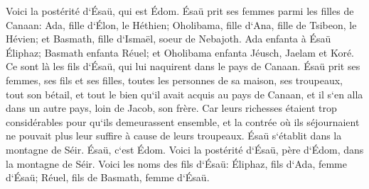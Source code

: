 \verse Voici la postérité d`Ésaü, qui est Édom. 
\verse Ésaü prit ses femmes parmi les filles de Canaan: Ada, fille d`Élon, le Héthien; Oholibama, fille d`Ana, fille de Tsibeon, le Hévien; 
\verse et Basmath, fille d`Ismaël, soeur de Nebajoth. 
\verse Ada enfanta à Ésaü Éliphaz; Basmath enfanta Réuel; 
\verse et Oholibama enfanta Jéusch, Jaelam et Koré. Ce sont là les fils d`Ésaü, qui lui naquirent dans le pays de Canaan. 
\verse Ésaü prit ses femmes, ses fils et ses filles, toutes les personnes de sa maison, ses troupeaux, tout son bétail, et tout le bien qu`il avait acquis au pays de Canaan, et il s`en alla dans un autre pays, loin de Jacob, son frère. 
\verse Car leurs richesses étaient trop considérables pour qu`ils demeurassent ensemble, et la contrée où ils séjournaient ne pouvait plus leur suffire à cause de leurs troupeaux. 
\verse Ésaü s`établit dans la montagne de Séir. Ésaü, c`est Édom. 
\verse Voici la postérité d`Ésaü, père d`Édom, dans la montagne de Séir. 
\verse Voici les noms des fils d`Ésaü: Éliphaz, fils d`Ada, femme d`Ésaü; Réuel, fils de Basmath, femme d`Ésaü. 
